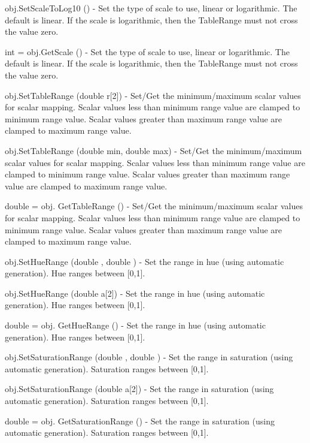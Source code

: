 \begin{DoxyItemize}
\item {\ttfamily obj.\-Set\-Scale\-To\-Log10 ()} -\/ Set the type of scale to use, linear or logarithmic. The default is linear. If the scale is logarithmic, then the Table\-Range must not cross the value zero.  
\item {\ttfamily int = obj.\-Get\-Scale ()} -\/ Set the type of scale to use, linear or logarithmic. The default is linear. If the scale is logarithmic, then the Table\-Range must not cross the value zero.  
\item {\ttfamily obj.\-Set\-Table\-Range (double r\mbox{[}2\mbox{]})} -\/ Set/\-Get the minimum/maximum scalar values for scalar mapping. Scalar values less than minimum range value are clamped to minimum range value. Scalar values greater than maximum range value are clamped to maximum range value.  
\item {\ttfamily obj.\-Set\-Table\-Range (double min, double max)} -\/ Set/\-Get the minimum/maximum scalar values for scalar mapping. Scalar values less than minimum range value are clamped to minimum range value. Scalar values greater than maximum range value are clamped to maximum range value.  
\item {\ttfamily double = obj. Get\-Table\-Range ()} -\/ Set/\-Get the minimum/maximum scalar values for scalar mapping. Scalar values less than minimum range value are clamped to minimum range value. Scalar values greater than maximum range value are clamped to maximum range value.  
\item {\ttfamily obj.\-Set\-Hue\-Range (double , double )} -\/ Set the range in hue (using automatic generation). Hue ranges between \mbox{[}0,1\mbox{]}.  
\item {\ttfamily obj.\-Set\-Hue\-Range (double a\mbox{[}2\mbox{]})} -\/ Set the range in hue (using automatic generation). Hue ranges between \mbox{[}0,1\mbox{]}.  
\item {\ttfamily double = obj. Get\-Hue\-Range ()} -\/ Set the range in hue (using automatic generation). Hue ranges between \mbox{[}0,1\mbox{]}.  
\item {\ttfamily obj.\-Set\-Saturation\-Range (double , double )} -\/ Set the range in saturation (using automatic generation). Saturation ranges between \mbox{[}0,1\mbox{]}.  
\item {\ttfamily obj.\-Set\-Saturation\-Range (double a\mbox{[}2\mbox{]})} -\/ Set the range in saturation (using automatic generation). Saturation ranges between \mbox{[}0,1\mbox{]}.  
\item {\ttfamily double = obj. Get\-Saturation\-Range ()} -\/ Set the range in saturation (using automatic generation). Saturation ranges between \mbox{[}0,1\mbox{]}.  

\end{DoxyItemize}
